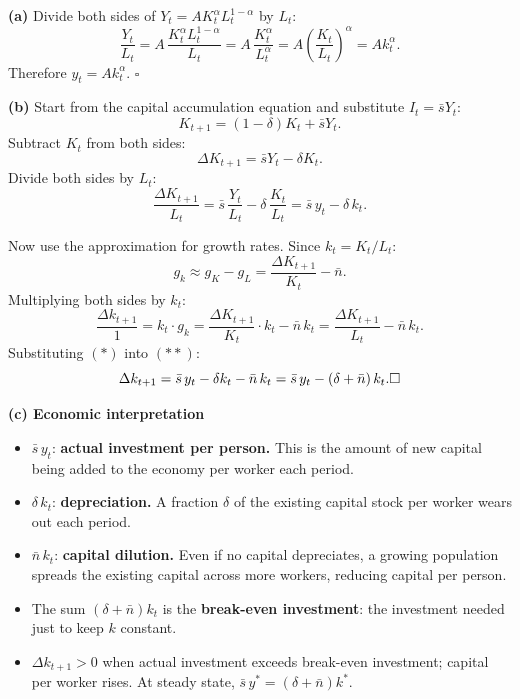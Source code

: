 \documentclass[12pt]{article}
\newenvironment{soln}{%
  \begin{tcolorbox}[
    breakable,
    colback=blue!4!white,
    colframe=blue!50!black,
    title={\textbf{Solution}},
    fonttitle=\small,
    left=4pt, right=4pt, top=4pt, bottom=4pt
  ]
}{%
  \end{tcolorbox}
}
\begin{document}
\begin{soln}
\textbf{(a)} Divide both sides of $Y_t = AK_t^\alpha L_t^{1-\alpha}$
by $L_t$:
\[
  \frac{Y_t}{L_t}
  = A\,\frac{K_t^\alpha L_t^{1-\alpha}}{L_t}
  = A\,\frac{K_t^\alpha}{L_t^\alpha}
  = A\left(\frac{K_t}{L_t}\right)^\alpha
  = A k_t^\alpha.
\]
Therefore $y_t = Ak_t^\alpha$. \hfill $\square$

\textbf{(b)} Start from the capital accumulation equation and substitute
$I_t = \bar{s}Y_t$:
\[
  K_{t+1} = (1-\delta)K_t + \bar{s}Y_t.
\]
Subtract $K_t$ from both sides:
\[
  \Delta K_{t+1} = \bar{s}Y_t - \delta K_t.
\]
Divide both sides by $L_t$:
\[
  \frac{\Delta K_{t+1}}{L_t} = \bar{s}\,\frac{Y_t}{L_t} - \delta\,\frac{K_t}{L_t}
  = \bar{s}\,y_t - \delta\,k_t. \tag{$*$}
\]

Now use the approximation for growth rates.  Since $k_t = K_t/L_t$:
\[
  g_k \approx g_K - g_L = \frac{\Delta K_{t+1}}{K_t} - \bar{n}.
\]
Multiplying both sides by $k_t$:
\[
  \frac{\Delta k_{t+1}}{1} = k_t \cdot g_k
  = \frac{\Delta K_{t+1}}{K_t}\cdot k_t - \bar{n}\,k_t
  = \frac{\Delta K_{t+1}}{L_t} - \bar{n}\,k_t. \tag{$**$}
\]
Substituting $(*)$ into $(**)$:
\[
  \Delta k_{t+1} = \bar{s}\,y_t - \delta k_t - \bar{n}\,k_t
  = \bar{s}\,y_t - (\delta + \bar{n})\,k_t. \hfill \square
\]

\textbf{(c) Economic interpretation}

\begin{itemize}[leftmargin=1.5em,itemsep=4pt]
  \item $\bar{s}\,y_t$: \textbf{actual investment per person.}
        This is the amount of new capital being added to the economy
        per worker each period.

  \item $\delta\,k_t$: \textbf{depreciation.}  A fraction $\delta$ of the
        existing capital stock per worker wears out each period.

  \item $\bar{n}\,k_t$: \textbf{capital dilution.}  Even if no capital
        depreciates, a growing population spreads the existing capital across
        more workers, reducing capital per person.

  \item The sum $(\delta+\bar{n})k_t$ is the \textbf{break-even investment}:
        the investment needed just to keep $k$ constant.

  \item $\Delta k_{t+1} > 0$ when actual investment exceeds break-even
        investment; capital per worker rises.  At steady state,
        $\bar{s}\,y^* = (\delta+\bar{n})k^*$.
\end{itemize}
\end{soln}
\end{document}
